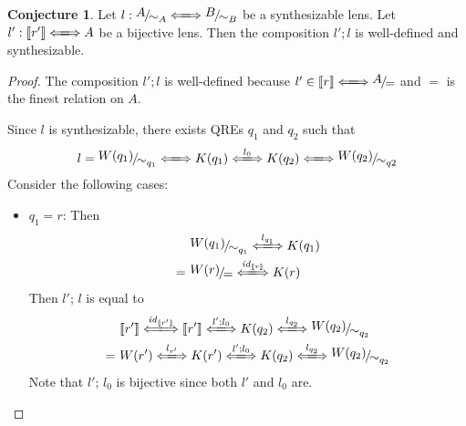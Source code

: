 \documentclass[a4paper,11pt] {article}
\theoremstyle{definition}
\newtheorem{conjecture}[theorem]{Conjecture}
\newcommand{\lensbetween}[1]{\xLongleftrightarrow{#1}}
\newcommand{\niceFrac}[2]{%
    \raise.5ex\hbox{$#1$}%
    \kern-.1em/\kern-.15em%
    \lower.25ex\hbox{$#2$}}
\begin{document}
\begin{conjecture}
  Let $l: \niceFrac{A}{\sim_A} \lensbetween{} \niceFrac{B}{\sim_B}$ be a
  synthesizable lens. Let 
  $l': \llbracket r' \rrbracket \lensbetween{} A$
  be a bijective lens. Then the composition
  $l'; l$ is well-defined and synthesizable.
\end{conjecture}
\begin{proof}
  The composition $l'; l$ is well-defined because
  $l' \in \llbracket r \rrbracket \lensbetween{} \niceFrac{A}{=}$
  and $=$ is the finest relation on $A$.

  Since $l$ is synthesizable, there exists QREs $q_1$ and $q_2$ such
  that
  \begin{align*}
    l = \niceFrac{W(q_1)}{\sim_{q_1}} \lensbetween{}
    K(q_1) \lensbetween{l_0} K(q_2) \lensbetween{}
    \niceFrac{W(q_2)}{\sim_{q2}}
  \end{align*}
  Consider the following cases:
  \begin{itemize}
  \item $q_1 = r$:
    Then
    \begin{align*}
      &\niceFrac{W(q_1)}{\sim_{q_1}}
      \lensbetween{l_{q_1}} K(q_1) \\
      =~&\niceFrac{W(r)}{=}
      \lensbetween{\mathit{id}_{\llbracket r \rrbracket}} K(r) 
    \end{align*}
    Then $l'; \, l$ is equal to
    \begin{align*}
      &\llbracket r' \rrbracket
      \lensbetween{\mathit{id}_{\llbracket r' \rrbracket}}
      \llbracket r' \rrbracket
      \lensbetween{l'; l_0} K(q_2) \lensbetween{l_{q_2}}
      \niceFrac{W(q_2)}{\sim_{q_2}} \\
      =~&
      W(r') \lensbetween{l_{r'}} K(r')
      \lensbetween{l'; l_0} K(q_2) \lensbetween{l_{q_2}}
      \niceFrac{W(q_2)}{\sim_{q_2}}
    \end{align*}
    Note that $l';\, l_0$ is bijective since both $l'$ and $l_0$ are.
    

\end{itemize}
\end{proof}
\end{document}
